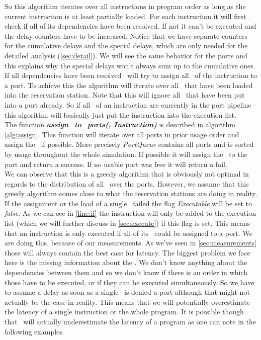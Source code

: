 So this algorithm iterates over all instructions in program order as long as the current instruction is at least partially loaded. For each instruction it will first check if all of its dependencies have been resolved. If not it can't be executed and the delay counters have to be increased. Notice that we have separate counters for the cumulative delays and the special delays, which are only needed for the detailed analysis (\autoref{sec:detail}). We will see the same behavior for the ports and this explains why the special delays won't always sum up to the cumulative ones.\\
If all dependencies have been resolved \suaca\ will try to assign all \microops\ of the instruction to a port. To achieve this the algorithm will iterate over all \microops\ that have been loaded into the reservation station. Note that this will ignore all \microops\ that have been put into a port already. So if all \microops\ of an instruction are currently in the port pipeline this algorithm will basically just put the instruction into the execution list.\\ 
The function \textbf{\emph{assign\_to\_ports(\microop, Instruction)}} is described in algorithm \ref{alg:assign}. This function will iterate over all ports in prior usage order and assign the \microop\ if possible. More precisely \emph{PortQueue} contains all ports and is sorted by usage throughout the whole simulation. If possible it will assign the \microop\ to the port and return a success. If no usable port was free it will return a fail.\\
We can observe that this is a greedy algorithm that is obviously not optimal in regards to the distribution of all \microops\ over the ports. However, we assume that this greedy algorithm comes close to what the reservation stations are doing in reality.\\
If the assignment or the load of a single \microop\ failed the flag \emph{Executable} will be set to \emph{false}. As we can see in \autoref{line:if} the instruction will only be added to the execution list (which we will further discuss in \autoref{sec:execute}) if this flag is set. This means that an instruction is only executed if all of its \microops\ could be assigned to a port. We are doing this, because of our measurements. As we've seen in \autoref{sec:measurements} those will always contain the best case for latency. The biggest problem we face here is the missing information about the \microops. We don't know anything about the dependencies between them and so we don't know if there is an order in which those have to be executed, or if they can be executed simultaneously. So we have to assume a delay as soon as a single \microop\ is denied a port although that might not actually be the case in reality. This means that we will potentially overestimate the latency of a single instruction or the whole program. It is possible though that \suaca\ will actually underestimate the latency of a program as one can note in the following examples.\\


